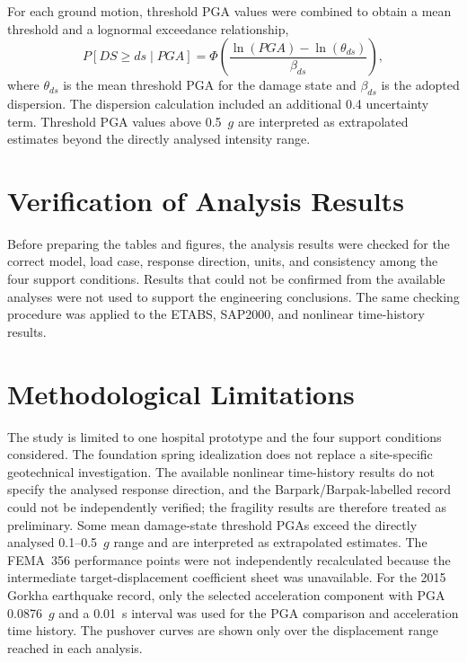 For each ground motion, threshold PGA values were combined to obtain a mean threshold and a lognormal exceedance relationship,
\[
P[DS\ge ds\mid PGA] = \Phi\left(\frac{\ln(PGA)-\ln(\theta_{ds})}{\beta_{ds}}\right),
\]
where $\theta_{ds}$ is the mean threshold PGA for the damage state and $\beta_{ds}$ is the adopted dispersion. The dispersion calculation included an additional 0.4 uncertainty term. Threshold PGA values above 0.5~$g$ are interpreted as extrapolated estimates beyond the directly analysed intensity range.

\section{Verification of Analysis Results}
Before preparing the tables and figures, the analysis results were checked for the correct model, load case, response direction, units, and consistency among the four support conditions. Results that could not be confirmed from the available analyses were not used to support the engineering conclusions. The same checking procedure was applied to the ETABS, SAP2000, and nonlinear time-history results.

\section{Methodological Limitations}
The study is limited to one hospital prototype and the four support conditions considered. The foundation spring idealization does not replace a site-specific geotechnical investigation. The available nonlinear time-history results do not specify the analysed response direction, and the Barpark/Barpak-labelled record could not be independently verified; the fragility results are therefore treated as preliminary. Some mean damage-state threshold PGAs exceed the directly analysed 0.1--0.5~$g$ range and are interpreted as extrapolated estimates. The FEMA~356 performance points were not independently recalculated because the intermediate target-displacement coefficient sheet was unavailable. For the 2015 Gorkha earthquake record, only the selected acceleration component with PGA 0.0876~$g$ and a 0.01~s interval was used for the PGA comparison and acceleration time history. The pushover curves are shown only over the displacement range reached in each analysis.
